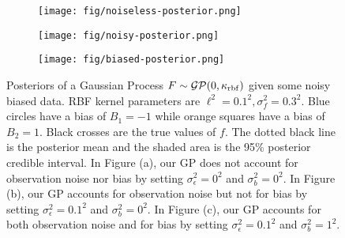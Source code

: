 \begin{figure}
    \centering
    \begin{subfigure}[b]{0.3\textwidth}
        \centering
        \texttt{[image: fig/noiseless-posterior.png]}
        \caption{}
        \label{subfig:noiseless-post}
    \end{subfigure}
    \hfill
    \begin{subfigure}[b]{0.3\textwidth}
        \centering
        \texttt{[image: fig/noisy-posterior.png]}
        \caption{}
        \label{subfig:noisy-posterior}
    \end{subfigure}
    \hfill
    \begin{subfigure}[b]{0.3\textwidth}
        \centering
        \texttt{[image: fig/biased-posterior.png]}
        \caption{}
        \label{subfig:biased-posterior}
    \end{subfigure}
    \hfill
    \caption{Posteriors of a Gaussian Process $F \sim \mathcal{GP}(0, \kappa_{\mathrm{rbf}})$ given some noisy biased data.
    RBF kernel parameters are $\ell^{2} = 0.1^2, \sigma^2_{f} = 0.3 ^ 2$.
    Blue circles have a bias of $B_1 = -1$ while orange squares have a bias of $B_2 = 1$.
    Black crosses are the true values of $f$.
    The dotted black line is the posterior mean and the shaded area is the 95\% posterior credible interval.
    In Figure (a), our GP does not account for observation noise nor bias by setting $\sigma_{\epsilon}^2 = 0^2$ and $\sigma^2_b = 0^2$.
    In Figure (b), our GP accounts for observation noise but not for bias by setting $\sigma_{\epsilon}^2 = 0.1^2$ and $\sigma^2_b = 0^2$.
    In Figure (c), our GP accounts for both observation noise and for bias by setting $\sigma_{\epsilon}^2 = 0.1^2$ and $\sigma^2_b = 1^2$.
    }
    \label{fig:gp-posteriors}
\end{figure}
